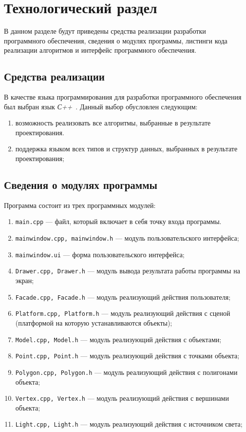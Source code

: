 \chapter{Технологический раздел}

В данном разделе будут приведены средства реализации разработки программного обеспечения, сведения о модулях программы, листинги кода реализации алгоритмов и интерфейс программного обеспечения.

\section{Средства реализации}

В качестве языка программирования для разработки программного обеспечения был выбран язык \textit{С++}~\cite{cplusplus}.
Данный выбор обусловлен следующим: 
\begin{enumerate}
	\item возможность реализовать все алгоритмы, выбранные в результате проектирования.
	\item поддержка языком всех типов и структур данных, выбранных в результате
	проектирования;
\end{enumerate}

\section{Сведения о модулях программы}
Программа состоит из трех программных модулей:
\begin{enumerate}
	\item \texttt{main.cpp} --- файл, который включает в себя точку входа программы.
	\item \texttt{mainwindow.cpp, mainwindow.h} --- модуль пользовательского интерфейса;
	\item \texttt{mainwindow.ui} --- форма пользовательского интерфейса;
	\item \texttt{Drawer.cpp, Drawer.h} --- модуль вывода результата работы программы на экран;
	\item \texttt{Facade.cpp, Facade.h} --- модуль реализующий действия пользователя;
	\item \texttt{Platform.cpp, Platform.h} --- модуль реализующий действия с сценой (платформой на которую устанавливаются объекты);
	\item \texttt{Model.cpp, Model.h} --- модуль реализующий действия с объектами;
	\item \texttt{Point.cpp, Point.h} --- модуль реализующий действия с точками объекта;
	\item \texttt{Polygon.cpp, Polygon.h} --- модуль реализующий действия с полигонами объекта;
	\item \texttt{Vertex.cpp, Vertex.h} --- модуль реализующий действия с вершинами объекта;
	\item \texttt{Light.cpp, Light.h} --- модуль реализующий действия с источником света;
\end{enumerate}


